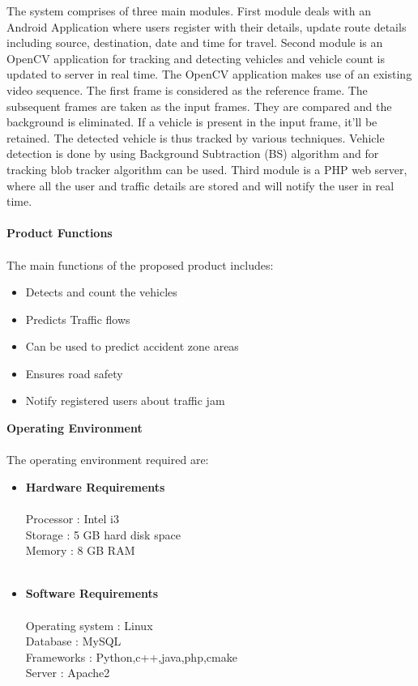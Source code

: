 The system comprises of three main modules. First module deals with an Android Application where users register with their details, update route details including source, destination, date and time for travel. Second module is an OpenCV application for tracking and detecting vehicles and vehicle count is updated to server in real time. The OpenCV application makes use of an existing video sequence. The first frame is considered as the reference frame. The subsequent frames are taken as the input frames. They are compared and the background is eliminated. If a vehicle is present in the input frame, it’ll be retained. The detected vehicle is thus tracked by various techniques. Vehicle detection is done by using Background Subtraction (BS) algorithm and for tracking blob tracker algorithm can be used. Third module is a PHP web server, where all the user and traffic details are stored and will notify the user in real time.  \\	
\\
\textbf{Product Functions}
\\
\\
The main functions of the proposed product includes:\\ 
\begin{itemize}
\item Detects and count the vehicles
\item Predicts Traffic flows
\item Can be used to predict accident zone areas
\item Ensures road safety
\item Notify registered users about traffic jam
\\
\end{itemize}
\textbf{Operating Environment}
\\ \\
The operating environment required are: \\
\begin{itemize}
\\
\item\textbf{ Hardware Requirements} \\ \\
Processor			:	Intel i3\\
Storage				: 	5 GB hard disk space\\
Memory				: 	8 GB RAM\\ 
\\
\item\textbf{Software Requirements} \\ \\
Operating system	: 	Linux\\
Database			: 	MySQL\\
Frameworks			: 	Python,c++,java,php,cmake\\
Server				: 	Apache2\\ \\ \\
\end{itemize}
